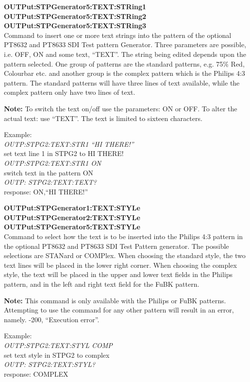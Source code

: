 \textbf{OUTPut:STPGenerator5:TEXT:STRing1}\\
\textbf{OUTPut:STPGenerator5:TEXT:STRing2}\\
\textbf{OUTPut:STPGenerator5:TEXT:STRing3}\\
Command to insert one or more text strings into the pattern of the optional PT8632 and PT8633 SDI Test pattern Generator. Three parameters are possible, i.e. OFF, ON and some text, ``TEXT''. The string being edited depends upon the pattern selected. One group of patterns are the standard patterns, e.g. 75\% Red, Colourbar etc. and another group is the complex pattern which is the Philips 4:3 pattern. The standard patterns will have three lines of text available, while the complex pattern only have two lines of text.

\textbf{Note:} To switch the text on/off use the parameters: ON or OFF. To alter the actual text: use ``TEXT''. The text is limited to sixteen characters. %

Example:\\
\textit{OUTP:STPG2:TEXT:STR1 ``HI THERE!''}\\
set text line 1 in STPG2 to HI THERE!\\
\textit{OUTP:STPG2:TEXT:STR1 ON}\\
switch text in the pattern ON\\
\textit{OUTP: STPG2:TEXT:TEXT?}\\
response: ON,``HI THERE!''

\textbf{OUTPut:STPGenerator1:TEXT:STYLe}\\
\textbf{OUTPut:STPGenerator2:TEXT:STYLe}\\
\textbf{OUTPut:STPGenerator5:TEXT:STYLe}\\
Command to select how the text is to be inserted into the Philips 4:3 pattern in the optional PT8632 and PT8633 SDI Test Pattern generator. The possible selections are STANard or COMPlex. When choosing the standard style, the two text lines will be placed in the lower right corner. When choosing the complex style, the text will be placed in the upper and lower text fields in the Philips pattern, and in the left and right text field for the FuBK pattern.

\textbf{Note:} This command is only available with the Philips or FuBK patterns. Attempting to use the command for any other pattern will result in an error, namely. -200, ``Execution error''.

Example:\\
\textit{OUTP:STPG2:TEXT:STYL COMP}\\
set text style in STPG2 to complex\\
\textit{OUTP: STPG2:TEXT:STYL?}\\
response: COMPLEX

